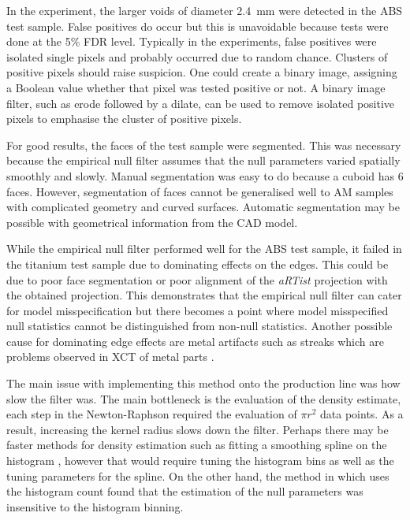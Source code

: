 In the experiment, the larger voids of diameter \SI{2.4}{\milli\metre} were detected in the ABS test sample. False positives do occur but this is unavoidable because tests were done at the 5\% FDR level. Typically in the experiments, false positives were isolated single pixels and probably occurred due to random chance. Clusters of positive pixels should raise suspicion. One could create a binary image, assigning a Boolean value whether that pixel was tested positive or not. A binary image filter, such as erode followed by a dilate, can be used to remove isolated positive pixels to emphasise the cluster of positive pixels.

For good results, the faces of the test sample were segmented. This was necessary because the empirical null filter assumes that the null parameters varied spatially smoothly and slowly. Manual segmentation was easy to do because a cuboid has 6 faces. However, segmentation of faces cannot be generalised well to AM samples with complicated geometry and curved surfaces. Automatic segmentation may be possible with geometrical information from the CAD model.

While the empirical null filter performed well for the ABS test sample, it failed in the titanium test sample due to dominating effects on the edges. This could be due to poor face segmentation or poor alignment of the \emph{aRTist} projection with the obtained projection. This demonstrates that the empirical null filter can cater for model misspecification but there becomes a point where model misspecified null statistics cannot be distinguished from non-null statistics. Another possible cause for dominating edge effects are metal artifacts such as streaks which are problems observed in XCT of metal parts \citep{deman1998metal, nawaz2014metal}.

The main issue with implementing this method onto the production line was how slow the filter was. The main bottleneck is the evaluation of the density estimate, each step in the Newton-Raphson required the evaluation of $\pi r^2$ data points. As a result, increasing the kernel radius slows down the filter. Perhaps there may be faster methods for density estimation such as fitting a smoothing spline on the histogram \citep{efron2004large}, however that would require tuning the histogram bins as well as the tuning parameters for the spline. On the other hand, the method in \cite{schwartzman2008empirical} which uses the histogram count found that the estimation of the null parameters was insensitive to the histogram binning.

